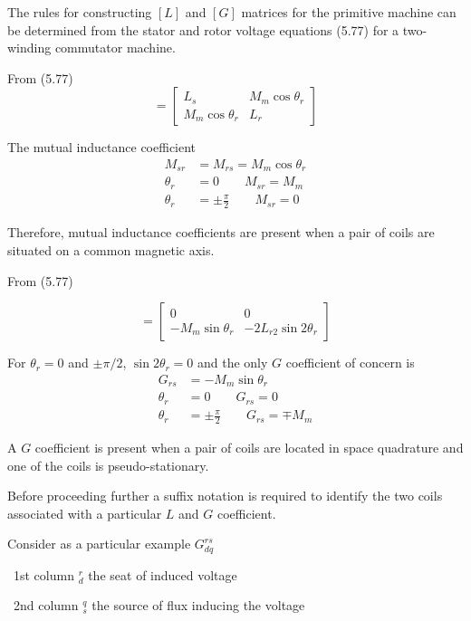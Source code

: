 \documentclass[a4paper,numbers=noenddot,12pt]{scrbook}
\begin{document}
The rules for constructing $[L]$ and $[G]$ matrices for the primitive machine can be determined from the stator and rotor voltage equations (5.77) for a two-winding commutator machine.

From (5.77)
\begin{equation*}
    [L] =
    \begin{bmatrix}
        L_s & M_m \cos \theta_r \\
        M_m \cos \theta_r & L_r
    \end{bmatrix}
\end{equation*}

The mutual inductance coefficient
\begin{align}
    M_{sr} & = M_{rs} = M_m \cos \theta_r \\
    \theta_r & = 0  \qquad M_{sr} = M_m \nonumber \\
    \theta_r & = \pm \frac{\pi}{2} \qquad M_{sr} = 0 \nonumber
\end{align}

Therefore, mutual inductance coefficients are present when a pair of coils are situated on a common magnetic axis.

From (5.77)

\begin{equation*}
    [G] = 
    \begin{bmatrix}
        0 & 0 \\ 
        -M_m \sin \theta_r & -2 L_{r2} \sin 2 \theta_r
    \end{bmatrix}
\end{equation*}

For $\theta_r = 0$ and $\pm \pi / 2$, $\sin 2 \theta_r = 0$ and the only $G$ coefficient of concern is
\begin{align}
    G_{rs} & =  - M_m \sin \theta_r \\
    \theta_r & = 0  \qquad G_{rs} = 0 \nonumber \\
    \theta_r & = \pm \frac{\pi}{2} \qquad G_{rs} = \mp M_m \nonumber
\end{align}

A $G$ coefficient is present when a pair of coils are located in space quadrature and one of the coils is pseudo-stationary.

Before proceeding further a suffix notation is required to identify the two coils associated with a particular $L$ and $G$ coefficient.

Consider as a particular example $G_{dq}^{rs}$ 

\TabPositions{1.5cm}
\tab\ 1st column $_d^r$ the seat of induced voltage \par
\tab\ 2nd column $_s^q$ the source of flux inducing the voltage
\end{document}
